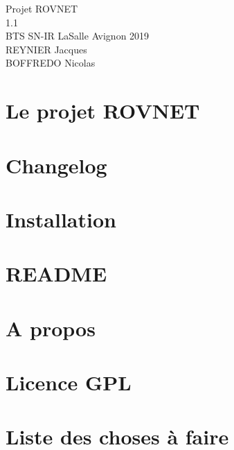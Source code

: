 \documentclass[twoside]{article}
\newcommand{\+}{\discretionary{\mbox{\scriptsize$\hookleftarrow$}}{}{}}
\begin{document}
\hypersetup{pageanchor=false,
             bookmarksnumbered=true,
             pdfencoding=unicode
            }
\begin{titlepage}
\vspace*{7cm}
\begin{center}%
{\LARGE Projet R\+OV\textquotesingle{}N\+ET \\[1ex]\large 1.\+1 }\\
\vspace*{1cm}
{\large BTS SN-IR LaSalle Avignon 2019}\\
\vspace*{1cm}
{\large REYNIER Jacques}\\
{\large BOFFREDO Nicolas}\\
\end{center}
\end{titlepage}
\tableofcontents
{}
\hypersetup{pageanchor=true}

\section{Le projet R\+OV\textquotesingle{}N\+ET}
\label{index}\hypertarget{index}{}
\section{Changelog}
\label{page_changelog}

\section{Installation}
\label{page_install}

\section{R\+E\+A\+D\+ME}
\label{page__r_e_a_d_m_e}

\section{A propos}
\label{page_about}

\section{Licence G\+PL}
\label{page_licence}

\section{Liste des choses à faire}
\label{todo}

\end{document}
